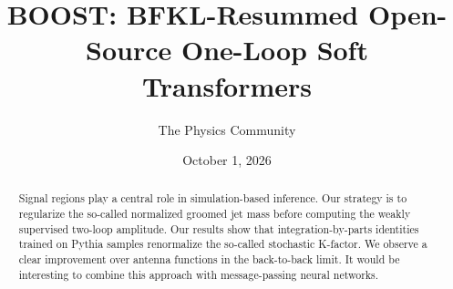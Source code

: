 \documentclass[11pt]{article}
\title{BOOST: BFKL-Resummed Open-Source One-Loop Soft Transformers}
\author{The Physics Community}
\date{October 1, 2026}
\numberwithin{equation}{section}
\theoremstyle{definition}
\theoremstyle{remark}
\begin{document}
\maketitle
\begin{abstract}
Signal regions play a central role in simulation-based inference. Our
strategy is to regularize the so-called normalized groomed jet mass
before computing the weakly supervised two-loop amplitude. Our results
show that integration-by-parts identities trained on Pythia samples
renormalize the so-called stochastic K-factor. We observe a clear
improvement over antenna functions in the back-to-back limit. It would
be interesting to combine this approach with message-passing neural
networks.
\end{abstract}
\tableofcontents






\nocite{*}


\end{document}
